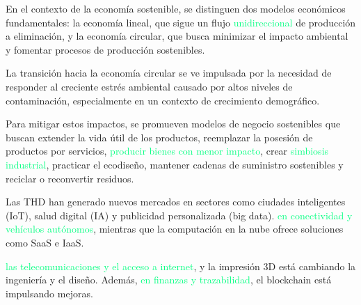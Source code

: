 


En el contexto de la economía sostenible, se distinguen dos modelos económicos fundamentales: la economía lineal, que sigue un flujo 
\textcolor{samuraiRed}{} \textcolor{springGreen}{unidireccional} de producción a eliminación, y la economía circular, que busca minimizar el impacto ambiental y fomentar procesos de producción sostenibles.

La transición hacia la economía circular se ve impulsada por la necesidad de responder al creciente estrés ambiental causado por altos niveles de contaminación, especialmente en un contexto de crecimiento demográfico.

Para mitigar estos impactos, se promueven modelos de negocio sostenibles que buscan extender la vida útil de los productos, reemplazar la posesión de productos por servicios, 
\textcolor{samuraiRed}{} \textcolor{springGreen}{producir bienes con menor impacto}, crear 
\textcolor{samuraiRed}{} \textcolor{springGreen}{simbiosis industrial}, practicar el ecodiseño, mantener cadenas de suministro sostenibles y reciclar o reconvertir residuos.

\vspace{2em}
\hrulefill
\vspace{2em}


Las THD han generado nuevos mercados en sectores como ciudades inteligentes (IoT), salud digital (IA) y publicidad personalizada (big data). 
\textcolor{samuraiRed}{} \textcolor{springGreen}{ en conectividad y vehículos autónomos}, mientras que la computación en la nube ofrece soluciones como SaaS e IaaS.  

\textcolor{samuraiRed}{} {\textcolor{springGreen}{ las telecomunicaciones y el acceso a internet}}, y la impresión 3D está cambiando la ingeniería y el diseño. 
Además, \textcolor{samuraiRed}{} \textcolor{springGreen}{ en finanzas y trazabilidad}, el blockchain está impulsando mejoras.
